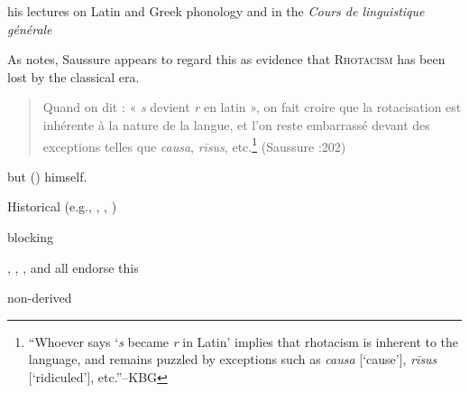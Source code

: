 

\citet{Baldi1994}
\citet[41f.]{Safarewicz1932}

his lectures on Latin and Greek phonology \citep{Reichler-Beguelin1980} and in the \emph{Cours de linguistique générale} \citep{CLG}

As \citet[54]{Anderson1985} notes, Saussure appears to regard this as evidence that \textsc{Rhotacism} has been lost by the classical era.

\begin{quote}
Quand on dit : « \emph{s} devient \emph{r} en latin », on fait croire que
la rotacisation est inhérente à la nature de la langue, et l'on reste
embarrassé devant des exceptions telles que \emph{causa}, \emph{rīsus},
etc.\footnote{
    ``Whoever says `\emph{s} became \emph{r} in Latin' implies
that rhotacism is inherent to the language, and remains puzzled by
exceptions such as \emph{causa} [`cause'], \emph{rīsus} [`ridiculed'],
etc.''--KBG}
(Saussure \citeyear{CLG}:202)
\end{quote}

\citep{KiparskyInPress} but
\citeauthor{KiparskyInPress} (\citeyear{Kiparsky1968,Kiparsky1973a,Kiparsky1982a,Kiparsky1993}) himself.

Historical (e.g., \citealt[\S180]{Leumann1977}, \citealt[\S173]{Sihler1995}, \citealt[\S119]{Sommer1902})

blocking

\citet[42f.]{Cser2010}, \citet[144]{Gruber2006}, \citet[66]{Ito2003}, and \citet[88]{Roberts2012} all endorse this



non-derived

\citet[90]{Blumenfeld2003}
\citet[149]{Gruber2006}
\citet{Roberts2012}
\citet[260f.]{Touratier1971}


